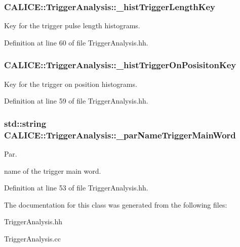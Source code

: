 \subsubsection[{\-\_\-hist\-Trigger\-Length\-Key}]{ C\-A\-L\-I\-C\-E\-::\-Trigger\-Analysis\-::\-\_\-hist\-Trigger\-Length\-Key\hspace{0.3cm}{\ttfamily [private]}}\label{classCALICE_1_1TriggerAnalysis_a4af95b807dcdd3389a2b64663f31e6db}


Key for the trigger pulse length histograms. 



Definition at line 60 of file Trigger\-Analysis.\-hh.

\subsubsection[{\-\_\-hist\-Trigger\-On\-Posisiton\-Key}]{ C\-A\-L\-I\-C\-E\-::\-Trigger\-Analysis\-::\-\_\-hist\-Trigger\-On\-Posisiton\-Key\hspace{0.3cm}{\ttfamily [private]}}\label{classCALICE_1_1TriggerAnalysis_a9e02480c102f82efe0629255b7bc1bd3}


Key for the trigger on position histograms. 



Definition at line 59 of file Trigger\-Analysis.\-hh.

\subsubsection[{\-\_\-par\-Name\-Trigger\-Main\-Word}]{\setlength{\rightskip}{0pt plus 5cm}std\-::string C\-A\-L\-I\-C\-E\-::\-Trigger\-Analysis\-::\-\_\-par\-Name\-Trigger\-Main\-Word\hspace{0.3cm}{\ttfamily [private]}}\label{classCALICE_1_1TriggerAnalysis_a4601167e6fe8aa42e2336a893bf83a21}


Par. 

name of the trigger main word. 

Definition at line 53 of file Trigger\-Analysis.\-hh.



The documentation for this class was generated from the following files\-:\begin{DoxyCompactItemize}
\item 
Trigger\-Analysis.\-hh\item 
Trigger\-Analysis.\-cc\end{DoxyCompactItemize}
